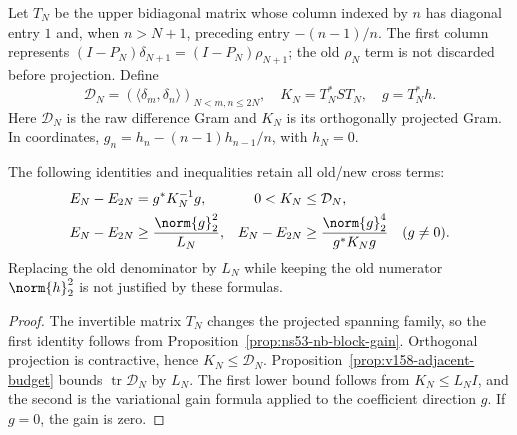 Let $T_N$ be the upper bidiagonal matrix whose column indexed by $n$
has diagonal entry $1$ and, when $n>N+1$, preceding entry $-(n-1)/n$.
The first column represents $(I-P_N)\delta_{N+1}=(I-P_N)\rho_{N+1}$;
the old $\rho_N$ term is not discarded before projection. Define
\begin{equation}
 \mathcal D_N=(\langle \delta_m,\delta_n\rangle)_{N<m,n\leq2N},\quad
 K_N=T_N^*S T_N,\quad g=T_N^*h.
 \label{eq:v158-difference-gram}
\end{equation}
Here $\mathcal D_N$ is the raw difference Gram and $K_N$ is its
orthogonally projected Gram. In coordinates,
$g_n=h_n-(n-1)h_{n-1}/n$, with $h_N=0$.

\begin{proposition}
\label{prop:v158-difference-gain}
The following identities and inequalities retain all old/new cross terms:
\begin{align}
 E_N-E_{2N}&=g^*K_N^{-1}g, & 0<K_N&\leq\mathcal D_N,
 \label{eq:v158-exact-difference-gain}\\
 E_N-E_{2N}&\geq\frac{\norm{g}_2^2}{L_N},&
 E_N-E_{2N}&\geq
 \frac{\norm{g}_2^4}{g^*K_Ng}\quad(g\ne0).
 \label{eq:v158-difference-bounds}
\end{align}
Replacing the old denominator by $L_N$ while keeping the old numerator
$\norm{h}_2^2$ is not justified by these formulas.
\end{proposition}
\begin{proof}
The invertible matrix $T_N$ changes the projected spanning family, so the
first identity follows from Proposition~\ref{prop:ns53-nb-block-gain}.
Orthogonal projection is contractive, hence $K_N\leq\mathcal D_N$.
Proposition~\ref{prop:v158-adjacent-budget} bounds
$\operatorname{tr}\mathcal D_N$ by $L_N$. The first lower bound follows
from $K_N\leq L_N I$, and the second is the variational gain formula
applied to the coefficient direction $g$. If $g=0$, the gain is zero.
\end{proof}

